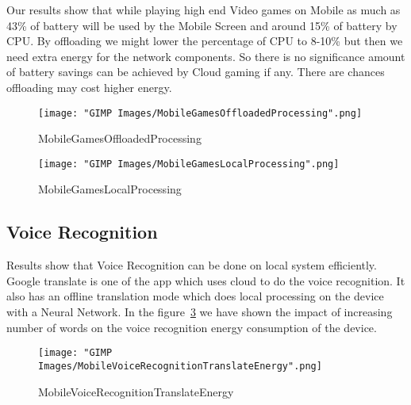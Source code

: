 \documentclass[12pt]{report}
\begin{document}
Our results show that while playing high end Video games on Mobile as much as 43\% of battery will be used by the Mobile Screen and around 15\% of battery by CPU. By offloading we might lower the percentage of CPU to 8-10\% but then we need extra energy for the network components. So there is no significance amount of battery savings can be achieved by Cloud gaming if any. There are chances offloading may cost higher energy.

\begin{figure}[h]
  \centering
  \texttt{[image: "GIMP Images/MobileGamesOffloadedProcessing".png]}
  \caption{MobileGamesOffloadedProcessing}
  \label{fig:MobileGamesOffloadedProcessing}
\end{figure}

\begin{figure}[h]
  \centering
  \texttt{[image: "GIMP Images/MobileGamesLocalProcessing".png]}
  \caption{MobileGamesLocalProcessing}
  \label{fig:MobileGamesLocalProcessing}
\end{figure}

\subsection{Voice Recognition}
Results show that Voice Recognition can be done on local system efficiently. Google translate is one of the app which uses cloud to do the voice recognition. It also has an offline translation mode which does local processing on the device with a Neural Network.
In the figure~\ref{fig:MobileVoiceRecognitionTranslateEnergy} we have shown the impact of increasing number of words on the voice recognition energy consumption of the device.
\begin{figure}[h]
  \centering
  \texttt{[image: "GIMP Images/MobileVoiceRecognitionTranslateEnergy".png]}
  \caption{MobileVoiceRecognitionTranslateEnergy}
  \label{fig:MobileVoiceRecognitionTranslateEnergy}
\end{figure}
\end{document}
